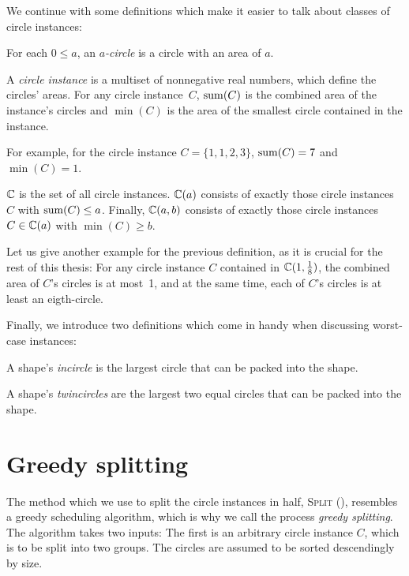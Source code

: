 \documentclass[a4paper,style=print,bibliography=totoc,nexus,lnum,extramargin]{tubsbook}
\begin{document}
We continue with some definitions which make it easier to talk about classes of circle instances:

\begin{definition}
    For each $0 \le a$, an \emph{$a$-circle} is a circle with an area of $a$.
\end{definition}

\begin{definition}\label{def:circle-instance}
    A \emph{circle instance} is a multiset of nonnegative real numbers, which define the circles' areas.
    For any circle instance~$C$, $\operatorname{sum}(C)$ is the combined area of the instance's circles and $\min(C)$ is the area of the smallest circle contained in the instance.
\end{definition}

For example, for the circle instance $C = \{1,1,2,3\}$, $\operatorname{sum}(C) = 7$ and $\min(C) = 1$.

\begin{definition}
    $\mathbb{C}$ is the set of all circle instances. $\mathbb{C}(a)$ consists of exactly those circle instances $C$ with $\operatorname{sum}(C) \le a$. Finally, $\mathbb{C}(a,b)$ consists of exactly those circle instances $C \in \mathbb{C}(a)$ with $\min(C) \ge b$.
\end{definition}

Let us give another example for the previous definition, as it is crucial for the rest of this thesis: For any circle instance $C$ contained in $\mathbb{C}(1,\frac{1}{8})$, the combined area of $C$'s circles is at most~1, and at the same time, each of $C$'s circles is at least an eigth-circle.

Finally, we introduce two definitions which come in handy when discussing worst-case instances:

\begin{definition}
    A shape's \emph{incircle} is the largest circle that can be packed into the shape.
\end{definition}

\begin{definition}
    A shape's \emph{twincircles} are the largest two equal circles that can be packed into the shape.
\end{definition}

\pagebreak

\section{Greedy splitting}

The method which we use to split the circle instances in half, \textsc{Split} (), resembles a greedy scheduling algorithm, which is why we call the process \emph{greedy splitting}. The algorithm takes two inputs: The first is an arbitrary circle instance $C$, which is to be split into two groups. The circles are assumed to be sorted descendingly by size.
\end{document}
